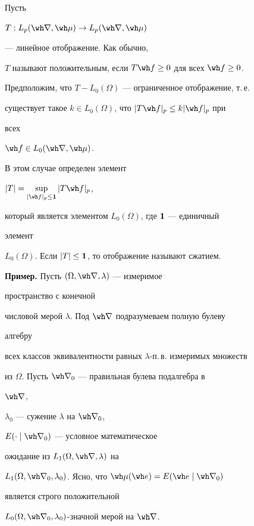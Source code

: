  


Пусть 


$T:L_p(\wh\nabla,\wh\mu)\to L_p(\wh\nabla,\wh\mu)$ 


--- линейное отображение. Как обычно, 


$T$ называют положительным, если $T\wh f\ge0$ для всех $\wh f\ge0$. 


Предположим, что $T-L_0(\Omega)$ --- ограниченное отображение, т.\,е. 


существует такое $k\in L_0(\Omega)$, что $|T\wh f|_p\le k|\wh f|_p$ при 


всех 


$\wh f\in L_0(\wh\nabla,\wh\mu)$. 


В этом случае определен элемент 


$|T|=\sup\limits_{|\wh f|_p\le\bold 1}|T\wh f|_p$, 


который является элементом $L_0(\Omega)$, где $\bold 1$ --- единичный 


элемент 


$L_0(\Omega)$. Если $|T|\le\bold 1$, то отображение называют сжатием. 


\medskip 


 


{\bf Пример.} Пусть $(\Omega,\wh\nabla,\lambda)$ --- измеримое 


пространство с конечной 


числовой мерой $\lambda$. Под $\wh\nabla$ подразумеваем полную булеву 


алгебру 


всех классов эквивалентности равных $\lambda$-п.\,в. измеримых множеств 


из $\Omega$. Пусть $\wh\nabla_0$ --- правильная булева подалгебра в 


$\wh\nabla$, 


$\lambda_0$ --- сужение $\lambda$ на $\wh\nabla_0$, 


$E(\cdot\mid\wh\nabla_0)$ --- условное математическое 


ожидание из $L_1(\Omega,\wh\nabla,\lambda)$ на 


$L_1(\Omega,\wh\nabla_0,\lambda_0)$. Ясно, что $\wh\mu(\wh e)=E(\wh 


e\mid\wh\nabla_0)$ 


является строго положительной 


$L_0(\Omega,\wh\nabla_0,\lambda_0)$-значной мерой на $\wh\nabla$. 


